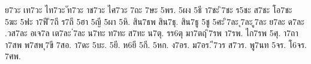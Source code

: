 {ย7วะ
เท7วะ
ไท7วะ
ัท7วะ
าช7วะ
ไศ7วะ
7ถะ
7ษะ
5พร.
5ผง
5ธี
า7ชะ
ิ7ชะ
ร5ชะ
ส7ชะ
โอ7ชะ
5ฆะ
5ฟะ
า7ฟี
ิ7ถี
ร7ถี
5ฮา
5ญี
5ผา
5หิ.
สิน7ธพ
สิน7ธุ.
สิน7ธู
5ชู
5ศะ
ิ7ละ
ุ7ละ
ู7ละ
ย7ละ
ด7ละ
.วส7ละ
อเจ7ล
เต7ละ
่7ละ
น7ทะ
ท7ทะ
ส7ทะ
น7ตุ.
รร6ตุ
มา7ตฤ
ิ7รพ
า7รพ.
ไก7รพ
5ศุ.
า7ถา
า7สพ
พ7สพ
ุ7ขี
7สอ.
า7ดะ
5บะ.
5ยี.
ห6ยี
5กี.
5หก.
ง7อร.
ม7อร.
ี7วร
ส7วร.
พู7นท
5จร.
โ6จร.
7ศพ.
}

